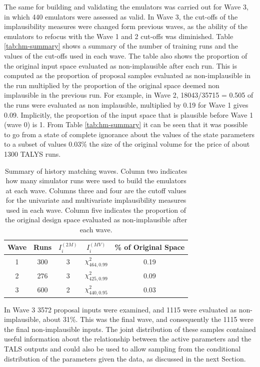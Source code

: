 \documentclass[
  12pt,
  a4paper,
  twoside]{book}
\begin{document}
The same for building and validating the emulators was carried out for Wave 3, in which 440 emulators were assessed as valid. In Wave 3, the cut-offs of the implausibility measures were changed form previous waves, as the ability of the emulators to refocus with the Wave 1 and 2 cut-offs was diminished. Table \ref{tab:hm-summary} shows a summary of the number of training runs and the values of the cut-offs used in each wave. The table also shows the proportion of the original input space evaluated as non-implausible after each run. This is computed as the proportion of proposal samples evaluated as non-implausible in the run multiplied by the proportion of the original space deemed non implausible in the previous run. For example, in Wave 2, 18043/35715 = 0.505 of the runs were evaluated as non implausible, multiplied by 0.19 for Wave 1 gives 0.09. Implicitly, the proportion of the input space that is plausible before Wave 1 (wave 0) is 1. From Table \ref{tab:hm-summary} it can be seen that it was possible to go from a state of complete ignorance about the values of the state parameters to a subset of values 0.03\% the size of the original volume for the price of about 1300 TALYS runs.

\begin{table}\centering
\label{hm-summary}
\caption{Summary of history matching waves. Column two indicates how many simulator runs were used to build the emulators at each wave. Columns three and four are the cutoff values for the univariate and multivariate implausibility measures used in each wave. Column five indicates the proportion of the original design space evaluated as non-implausible after each wave.}
\begin{tabular}{ccccc}\\
Wave & Runs &$I_i^{(2M)}$&$I_i^{(MV)}$& \% of Original Space \\
\hline
1 & 300 & 3 & $\chi^2_{464,0.99}$ & 0.19 \\
2 & 276 & 3 & $\chi^2_{425,0.99}$ &  0.09 \\
3 & 600 & 2 & $\chi^2_{440,0.95}$ & 0.03 \\
\hline
\end{tabular}
\end{table}

In Wave 3 3572 proposal inputs were examined, and 1115 were evaluated as non-implausible, about 31\%. This was the final wave, and consequently the 1115 were the final non-implausible inputs. The joint distribution of these samples contained useful information about the relationship between the active parameters and the TALS outputs and could also be used to allow sampling from the conditional distribution of the parameters given the data, as discussed in the next Section.
\end{document}
